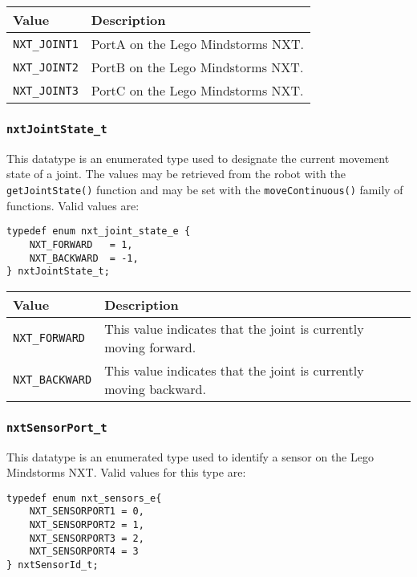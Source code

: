 \noindent
\begin{longtable}{p{3.5cm}p{12cm}} 
    \hline 
    Value & Description \\
    \hline 
    {\tt NXT\_JOINT1} & PortA on the Lego Mindstorms NXT. \\
    {\tt NXT\_JOINT2} & PortB on the Lego Mindstorms NXT. \\
    {\tt NXT\_JOINT3} & PortC on the Lego Mindstorms NXT. \\
    \hline
\end{longtable}

\subsubsection{\label{sec:nxtJointState_t}{\tt nxtJointState\_t}}
This datatype is an enumerated type used to designate the current 
movement state of a joint. The values may be retrieved from the 
robot with the {\tt getJointState()} function and may be set 
with the {\tt moveContinuous()} family of functions. Valid values are:
\begin{lstlisting}
typedef enum nxt_joint_state_e {
    NXT_FORWARD   = 1,
    NXT_BACKWARD  = -1,
} nxtJointState_t;
\end{lstlisting}

\noindent
\begin{longtable}{p{3.5cm}p{12cm}}
    \hline
    Value & Description \\
    \hline
    {\tt NXT\_FORWARD} & This value indicates that the joint is currently moving forward.  \\
{\tt NXT\_BACKWARD}& This value indicates that the joint is currently moving backward. \\
    \hline
\end{longtable}

\subsubsection{\label{sec:nxtSensorPort_t}{\tt nxtSensorPort\_t}}
This datatype is an enumerated type used to identify a sensor on 
the Lego Mindstorms NXT. Valid values for this type are:
\begin{lstlisting}
typedef enum nxt_sensors_e{
    NXT_SENSORPORT1 = 0,
    NXT_SENSORPORT2 = 1,
    NXT_SENSORPORT3 = 2,
    NXT_SENSORPORT4 = 3
} nxtSensorId_t;
\end{lstlisting}

